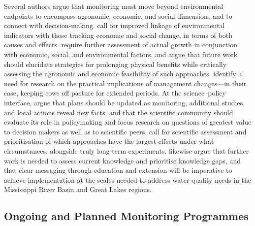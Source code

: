 Several authors argue that monitoring must move beyond environmental endpoints to encompass agronomic, economic, and social dimensions and to connect with decision-making. \textcite{Zhang2018} call for improved linkage of environmental indicators with those tracking economic and social change, in terms of both causes and effects. \textcite{Zhu2025} require further assessment of actual growth in conjunction with economic, social, and environmental factors, and \textcite{Brikmans2025} argue that future work should elucidate strategies for prolonging physical benefits while critically assessing the agronomic and economic feasibility of such approaches. \textcite{Monaghan2016} identify a need for research on the practical implications of management changes---in their case, keeping cows off pasture for extended periods. At the science--policy interface, \textcite{Letey1999} argue that plans should be updated as monitoring, additional studies, and local actions reveal new facts, and that the scientific community should evaluate its role in policymaking and focus research on questions of greatest value to decision makers as well as to scientific peers. \textcite{Clifford2023} call for scientific assessment and prioritisation of which approaches have the largest effects under what circumstances, alongside truly long-term experiments. \textcite{Kalcic2018} likewise argue that further work is needed to assess current knowledge and prioritise knowledge gaps, and that clear messaging through education and extension will be imperative to achieve implementation at the scales needed to address water-quality needs in the Mississippi River Basin and Great Lakes regions.

\subsection{Ongoing and Planned Monitoring Programmes}

